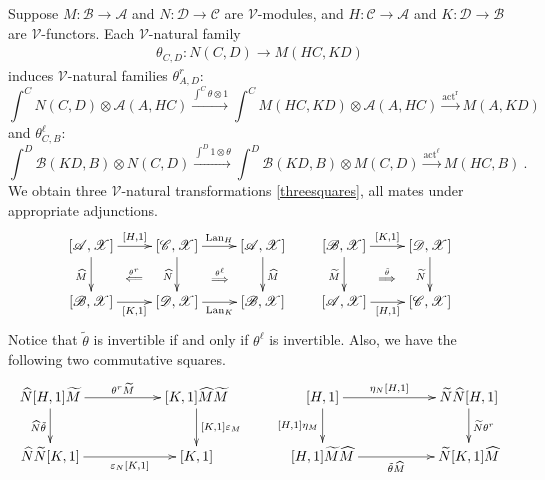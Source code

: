 \documentclass[a4paper,12pt,reqno]{amsart}
\theoremstyle{definition}
\theoremstyle{fact}
\theoremstyle{genquest}
\theoremstyle{step}
\newcommand{\dd}{\colon}
\newcommand{\lra}{\longrightarrow}
\newcommand{\ra}{\rightarrow}
\newcommand{\Lra}{\Longrightarrow}
\newcommand{\Lla}{\Longleftarrow}
\def\CA{{\mathscr A}}
\def\CB{{\mathscr B}}
\def\CC{{\mathscr C}}
\def\CD{{\mathscr D}}
\def\CV{{\mathscr V}}
\def\CX{{\mathscr X}}
\begin{document}
Suppose $M\dd \CB\ra \CA$ and $N\dd \CD\ra \CC$ are $\CV$-modules, and 
$H\dd \CC \ra \CA$ and $K\dd \CD\ra \CB$ are $\CV$-functors.
Each $\CV$-natural family 
\begin{eqnarray}\label{theta}
\theta_{C,D}\dd N(C,D)\ra M(HC,KD)
\end{eqnarray}
induces $\CV$-natural families $\theta^{r}_{A,D}\dd$
$$\int^C{N(C,D)\otimes \CA(A,HC)} \stackrel{\int^C{\theta \otimes 1}}\lra \int^C{M(HC,KD)\otimes \CA(A,HC)} \stackrel{\mathrm{act^r}} \lra M(A,KD)$$ 
and $\theta^{\ell}_{C,B}\dd$
$$\int^D{\CB(KD,B)\otimes N(C,D)} \stackrel{\int^D{1 \otimes \theta}}\lra \int^D{\CB(KD,B)\otimes M(C,D)} \stackrel{\mathrm{act^{\ell}}} \lra M(HC,B) \ .$$
We obtain three $\CV$-natural transformations \eqref{threesquares}, all mates under
appropriate adjunctions.
\begin{eqnarray}\label{threesquares}
\begin{aligned}
\xymatrix{\ar @{} [dr] | {\stackrel{\theta^{r}} \Lla}
[\CA,\CX] \ar[d]_-{\widehat{M}} \ar[r]^-{[H,1]} & \ar @{} [dr] | {\stackrel{\theta^{\ell}} \Lra} [\CC,\CX] \ar[d]_-{\widehat{N}} \ar[r]^-{\mathrm{Lan}_H} & [\CA,\CX] \ar[d]^-{\widehat{M}}\\
[\CB,\CX] \ar[r]_-{[K,1]}           & [\CD,\CX]  \ar[r]_-{\mathrm{Lan}_K} & [\CB,\CX]
}
\qquad
\xymatrix{\ar @{} [dr] | {\stackrel{\tilde{\theta}} \Lra}
[\CB,\CX] \ar[d]_-{\widetilde{M}} \ar[r]^-{[K,1]} &  [\CD,\CX] \ar[d]_-{\widetilde{N}} \\
[\CA,\CX] \ar[r]_-{[H,1]}           & [\CC,\CX] 
}
\end{aligned}
\end{eqnarray}
Notice that $\tilde{\theta}$ is invertible if and only if $\theta^{\ell}$ is invertible.
Also, we have the following two commutative squares.
\begin{equation}\label{thetamates}
\begin{aligned}
\xymatrix{
\widehat{N} [H,1] \widetilde{M} \ar[rr]^-{\theta^r\widetilde{M}} \ar[d]_-{\widehat{N}\tilde{\theta}} && [K,1] \widehat{M}\widetilde{M} \ar[d]^-{[K,1]\varepsilon_M} \\
\widehat{N}\widetilde{N} [K,1] \ar[rr]_-{\varepsilon_N [K,1]} && [K,1]}
\qquad
\xymatrix{
[H,1] \ar[rr]^-{\eta_N[H,1]} \ar[d]_-{[H,1]\eta_M} && \widetilde{N}\widehat{N}[H,1] \ar[d]^-{\widetilde{N}\theta^r} \\
[H,1]\widetilde{M}\widehat{M} \ar[rr]_-{\tilde{\theta}\widehat{M}} && \widetilde{N}[K,1]\widehat{M}}
\end{aligned}
\end{equation}
\end{document}
